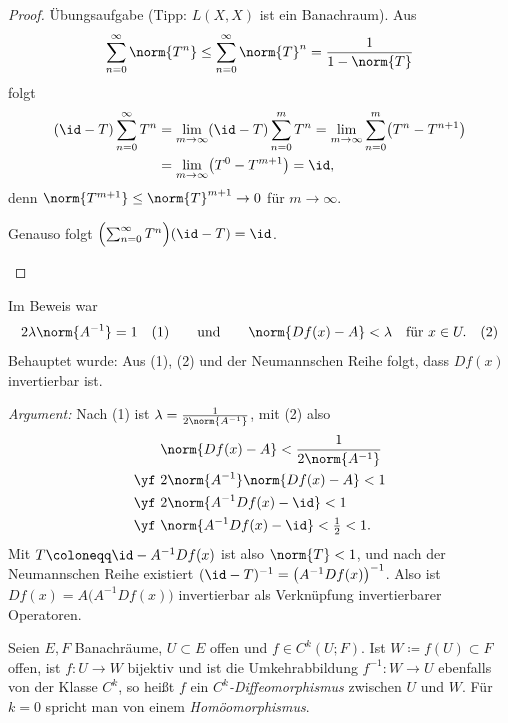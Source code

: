 \documentclass[11pt]{article}
\begin{document}
\begin{proof}
  Übungsaufgabe (Tipp: $L(X, X)$ ist ein Banachraum). Aus
  \[ \sum_{n=0}^{\infty} \norm{T^n} \le \sum_{n=0}^{\infty} \norm{T}^n = \frac{1}{1 - \norm{T}} \]
  folgt
  \begin{align*}
    (\id - T) \sum_{n=0}^{\infty} T^n &= \lim_{m \to \infty} (\id - T) \sum_{n=0}^{m} T^n = \lim_{m \to \infty} \sum_{n=0}^{m} \bigl(T^n - T^{n+1}\bigr) \\
    &= \lim_{m \to \infty} \bigl(T^0 - T^{m+1}\bigr) = \id,
  \end{align*}
  denn $\norm{T^{m+1}} \le \norm{T}^{m+1} \to 0$ für $m \to \infty$.
\begin{ergaenzung}
  Genauso folgt $\Bigl(\sum_{n=0}^{\infty} T^n\Bigr)(\id - T) = \id$.
  \end{ergaenzung}
\end{proof}


\begin{note}
  Im Beweis war
  \[ 2\lambda \norm{A^{-1}} = 1 \quad (1) \qquad \text{und} \qquad \norm{Df(x) - A} < \lambda \quad \text{für } x \in U. \quad (2) \]
  Behauptet wurde: Aus (1), (2) und der Neumannschen Reihe folgt, dass $Df(x)$ invertierbar ist.

  \textit{Argument:} Nach (1) ist $\lambda = \frac{1}{2\norm{A^{-1}}}$, mit (2) also
  \begin{align*}
    & \norm{Df(x) - A} < \frac{1}{2\norm{A^{-1}}} \\
    \yf\ & 2 \norm{A^{-1}} \norm{Df(x) - A} < 1 \\
    \yf\ & 2 \norm{A^{-1} Df(x) - \id} < 1 \\
    \yf\ & \norm{A^{-1} Df(x) - \id} < \tfrac{1}{2} < 1.
  \end{align*}
  Mit $T \coloneqq \id - A^{-1} Df(x)$ ist also $\norm{T} < 1$, und nach der Neumannschen Reihe existiert $(\id - T)^{-1} = \bigl(A^{-1} Df(x)\bigr)^{-1}$.
  Also ist $Df(x) = A \bigl(A^{-1} Df(x)\bigr)$ invertierbar als Verknüpfung invertierbarer Operatoren.
\end{note}


\begin{definition}[Diffeomorphismus]\Theorem
  Seien $E, F$ Banachräume, $U \subset E$ offen und $f \in C^k(U; F)$.
  Ist $W \coloneqq f(U) \subset F$ offen, ist $f\colon U \to W$ bijektiv und ist die Umkehrabbildung $f^{-1}\colon W \to U$ ebenfalls von der Klasse $C^k$, so heißt $f$ ein \emph{$C^k$-Diffeomorphismus} zwischen $U$ und $W$. Für $k = 0$ spricht man von einem \emph{Homöomorphismus}.
\end{definition}
\end{document}
